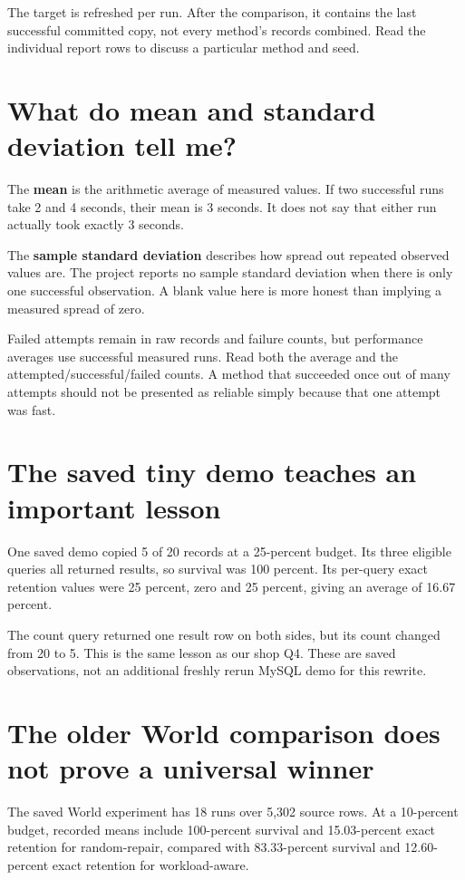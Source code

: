 \documentclass[12pt,a4paper,oneside]{report}
\begin{document}
The target is refreshed per run. After the comparison, it contains the last successful committed copy, not every method's records combined. Read the individual report rows to discuss a particular method and seed.

\section{What do mean and standard deviation tell me?}
The \textbf{mean} is the arithmetic average of measured values. If two successful runs take 2 and 4 seconds, their mean is 3 seconds. It does not say that either run actually took exactly 3 seconds.

The \textbf{sample standard deviation} describes how spread out repeated observed values are. The project reports no sample standard deviation when there is only one successful observation. A blank value here is more honest than implying a measured spread of zero.

Failed attempts remain in raw records and failure counts, but performance averages use successful measured runs. Read both the average and the attempted/successful/failed counts. A method that succeeded once out of many attempts should not be presented as reliable simply because that one attempt was fast.

\section{The saved tiny demo teaches an important lesson}
One saved demo copied 5 of 20 records at a 25-percent budget. Its three eligible queries all returned results, so survival was 100 percent. Its per-query exact retention values were 25 percent, zero and 25 percent, giving an average of 16.67 percent.

The count query returned one result row on both sides, but its count changed from 20 to 5. This is the same lesson as our shop Q4. These are saved observations, not an additional freshly rerun MySQL demo for this rewrite.

\section{The older World comparison does not prove a universal winner}
The saved World experiment has 18 runs over 5,302 source rows. At a 10-percent budget, recorded means include 100-percent survival and 15.03-percent exact retention for random-repair, compared with 83.33-percent survival and 12.60-percent exact retention for workload-aware.
\end{document}
